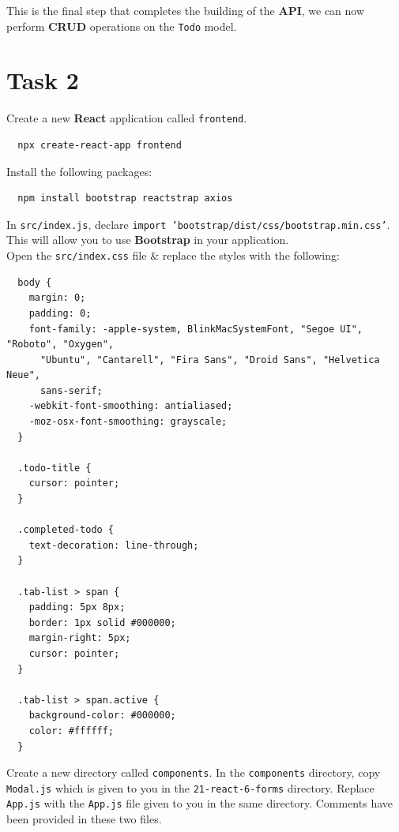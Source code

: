 \documentclass{article}
\begin{document}
This is the final step that completes the building of the \textbf{API}, we can now perform \textbf{CRUD} operations on the \texttt{Todo} model. 

\section*{Task 2} 

Create a new \textbf{React} application called \texttt{frontend}.

\begin{verbatim}
  npx create-react-app frontend
\end{verbatim}

Install the following packages:

\begin{verbatim}
  npm install bootstrap reactstrap axios
\end{verbatim}

In \texttt{src/index.js}, declare \texttt{import 'bootstrap/dist/css/bootstrap.min.css'}. This will allow you to use \textbf{Bootstrap} in your application. \\

Open the \texttt{src/index.css} file \& replace the styles with the following:

\begin{verbatim}
  body {
    margin: 0;
    padding: 0;
    font-family: -apple-system, BlinkMacSystemFont, "Segoe UI", "Roboto", "Oxygen",
      "Ubuntu", "Cantarell", "Fira Sans", "Droid Sans", "Helvetica Neue",
      sans-serif;
    -webkit-font-smoothing: antialiased;
    -moz-osx-font-smoothing: grayscale;
  }

  .todo-title {
    cursor: pointer;
  }

  .completed-todo {
    text-decoration: line-through;
  }

  .tab-list > span {
    padding: 5px 8px;
    border: 1px solid #000000;
    margin-right: 5px;
    cursor: pointer;
  }

  .tab-list > span.active {
    background-color: #000000;
    color: #ffffff;
  }
\end{verbatim}

Create a new directory called \texttt{components}. In the \texttt{components} directory, copy \texttt{Modal.js} which is given to you in the \texttt{21-react-6-forms} directory. Replace \texttt{App.js} with the \texttt{App.js} file given to you in the same directory. Comments have been provided in these two files. \\
\end{document}
